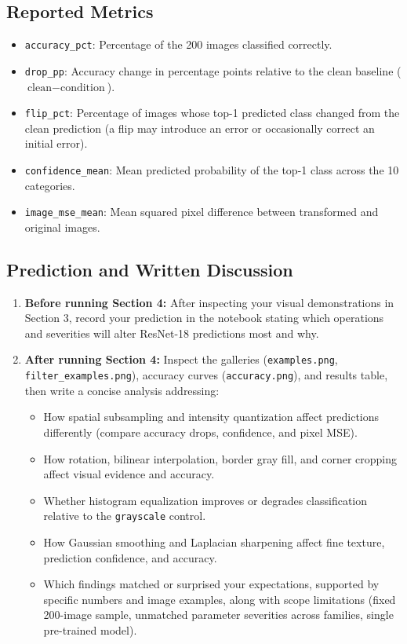 \documentclass[11pt,letterpaper]{article}
\newcommand{\code}[1]{\texttt{\textcolor{primary}{#1}}}
\begin{document}
\subsection{Reported Metrics}
\begin{itemize}
  \item \code{accuracy\_pct}: Percentage of the 200 images classified correctly.
  \item \code{drop\_pp}: Accuracy change in percentage points relative to the clean baseline ($\text{clean} - \text{condition}$).
  \item \code{flip\_pct}: Percentage of images whose top-1 predicted class changed from the clean prediction (a flip may introduce an error or occasionally correct an initial error).
  \item \code{confidence\_mean}: Mean predicted probability of the top-1 class across the 10 categories.
  \item \code{image\_mse\_mean}: Mean squared pixel difference between transformed and original images.
\end{itemize}

\clearpage
\subsection{Prediction and Written Discussion}
\begin{enumerate}
  \item \textbf{Before running Section 4:} After inspecting your visual demonstrations in Section 3, record your prediction in the notebook stating which operations and severities will alter ResNet-18 predictions most and why.
  \item \textbf{After running Section 4:} Inspect the galleries (\code{examples.png},
        \code{filter\_examples.png}), accuracy curves (\code{accuracy.png}), and results table, then write
        a concise analysis addressing:
        \begin{itemize}
          \item How spatial subsampling and intensity quantization affect predictions differently (compare accuracy drops, confidence, and pixel MSE).
          \item How rotation, bilinear interpolation, border gray fill, and corner cropping affect visual evidence and accuracy.
          \item Whether histogram equalization improves or degrades classification relative to the \code{grayscale} control.
          \item How Gaussian smoothing and Laplacian sharpening affect fine texture, prediction confidence, and accuracy.
          \item Which findings matched or surprised your expectations, supported by specific numbers and image examples, along with scope limitations (fixed 200-image sample, unmatched parameter severities across families, single pre-trained model).
        \end{itemize}
\end{enumerate}
\end{document}

